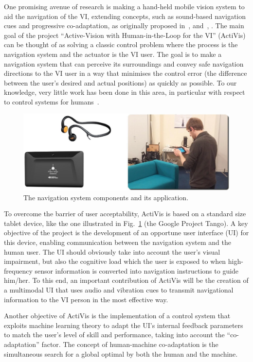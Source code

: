 \documentclass[format=sigconf, review=true, screen=true, anonymous=true]{acmart}
\begin{document}
One promising avenue of research is making a hand-held mobile vision system to aid the navigation of the VI, extending concepts, such as sound-based navigation cues and progressive co-adaptation, as originally proposed in~\citeauthor{bellotto2013}, \citeyear{bellotto2013} and~\citeauthor{gallina2015}, \citeyear{gallina2015}. The main goal of the project ``Active-Vision with Human-in-the-Loop for the VI'' (ActiVis) can be thought of as solving a classic control problem where the process is the navigation system and the actuator is the VI user. The goal is to make a navigation system that can perceive its surroundings and convey safe navigation directions to the VI user in a way that minimises the control error (the difference between the user's desired and actual positions) as quickly as possible. To our knowledge, very little work has been done in this area, in particular with respect to control systems for humans~\cite{book-humancontrol}.

\begin{figure}
  \centering
  \includegraphics[width=0.8\columnwidth]{figures/fullset.jpg}
  \caption{The navigation system components and its application.\label{fig:fullset}}
\end{figure}

To overcome the barrier of user acceptability, ActiVis is based on a standard size tablet device, like the one illustrated in Fig.~\ref{fig:fullset} (the Google Project Tango). A key objective of the project is the development of an opportune user interface (UI) for this device, enabling communication between the navigation system and the human user. The UI should obviously take into account the user's visual impairment, but also the cognitive load which the user is exposed to when high-frequency sensor information is converted into navigation instructions to guide him/her. To this end, an important contribution of ActiVis will be the creation of a multimodal UI that uses audio and vibration cues to transmit navigational information to the VI person in the most effective way.    

Another objective of ActiVis is the implementation of a control system that exploits machine learning theory to adapt the UI's internal feedback parameters to match the user's level of skill and performance, taking into account the ``co-adaptation'' factor. The concept of human-machine co-adaptation is the simultaneous search for a global optimal by both the human and the machine. 
\end{document}
